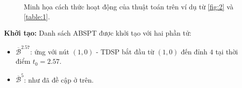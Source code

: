 \documentclass[../main.tex]{subfiles}
\begin{document}
\begin{figure}[h]

\caption{Minh họa cách thức hoạt động của thuật toán trên ví dụ
từ \autoref{fig:2} và \autoref{table:1}.}
\label{fig:6}
\end{figure}


\textbf{Khởi tạo:} Danh sách ABSPT được khởi tạo với hai phần tử:

\begin{itemize}
\tightlist
\item
  \(\overline{\mathcal B}^{2.57}\): ứng với nút \((1, 0)\) - TDSP bắt đầu từ
  \((1, 0)\) đến đỉnh \(4\) tại thời điểm \(t_0 = 2.57\).
\item
  \(\overline{\mathcal B}^{5}\): như đã đề cập ở trên.
\end{itemize}
\end{document}
